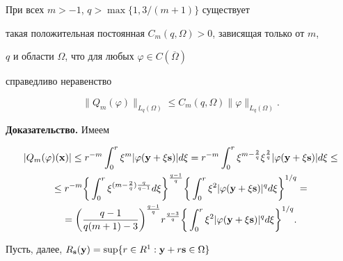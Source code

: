 \begin{lems}\label{l1}


При всех $m>-1$, $q>\max\{1,3/(m+1)\}$ существует


такая положительная постоянная $C_m(q,\Omega)>0$, зависящая только от $m$,


$q$ и области $\Omega$, что для любых $\varphi\in C(\overline{\Omega})$


справедливо неравенство


\begin{equation}


\|Q_m(\varphi)\|_{L_q(\Omega)}\leq


C_m(q,\Omega)\|\varphi\|_{L_q(\Omega)}.


\label{oq}


\end{equation}


\end{lems}





{\bf Доказательство.} Имеем


\begin{multline*}


|Q_m(\varphi)(\bold{x})|\leq


r^{-m}\int_0^r\xi^m|\varphi


(\bold{y}+\xi\bold{s})|d\xi=r^{-m}\int_0^r\xi^{m-\frac{2}{q}}


\xi^{\frac{2}{q}}|\varphi(\bold{y}+\xi\bold{s})|d\xi\leq\\


%


\leq r^{-m}\bigg\{\int_0^r\xi^{(m-\frac{2}{q})\frac{q}{q-1}}d\xi\bigg\}^


{\frac{q-1}{q}}\bigg\{\int_0^r\xi^2|\varphi(\bold{y}+\xi\bold{s})|^qd\xi


\bigg\}^{1/q}= \\


%


=\bigg(\frac{q-1}{q(m+1)-3}\bigg)^{\frac{q-1}{q}}r^{\frac{q-3}{q}}


\bigg\{\int_0^r\xi^2|\varphi(\bold{y}+\xi\bold{s})|^qd\xi\bigg\}^{1/q}.


\end{multline*}





Пусть, далее, $R_{\bold{s}}(\bold{y})=\sup\{r\in


R^1:\bold{y}+r\bold{s}\in\Omega\}$


